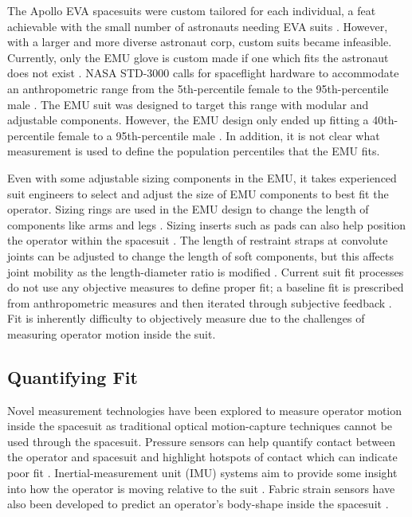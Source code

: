 \documentclass[defaultstyle,11pt]{thesis}
\begin{document}
The Apollo EVA spacesuits were custom tailored for each individual, a feat achievable with the small number of astronauts needing EVA suits \citep{Harris2001}.
However, with a larger and more diverse astronaut corp, custom suits became infeasible.
Currently, only the EMU glove is custom made if one which fits the astronaut does not exist \citep{Chappell2017}.
NASA STD-3000 calls for spaceflight hardware to accommodate an anthropometric range from the 5th-percentile female to the 95th-percentile male \citep{NASA1995}.
The EMU suit was designed to target this range with modular and adjustable components.
However, the EMU design only ended up fitting a 40th-percentile female to a 95th-percentile male \citep{Kim2019}.
In addition, it is not clear what measurement is used to define the population percentiles that the EMU fits.

Even with some adjustable sizing components in the EMU, it takes experienced suit engineers to select and adjust the size of EMU components to best fit the operator.
Sizing rings are used in the EMU design to change the length of components like arms and legs \citep{Harris2001}.
Sizing inserts such as pads can also help position the operator within the spacesuit \citep{Chappell2017}.
The length of restraint straps at convolute joints can be adjusted to change the length of soft components, but this affects joint mobility as the length-diameter ratio is modified \citep{Harris2001}.
Current suit fit processes do not use any objective measures to define proper fit; a baseline fit is prescribed from anthropometric measures and then iterated through subjective feedback \citep{Fineman2017}.
Fit is inherently difficulty to objectively measure due to the challenges of measuring operator motion inside the suit.

\hypertarget{quantifying-fit}{%
\subsection{Quantifying Fit}\label{quantifying-fit}}

Novel measurement technologies have been explored to measure operator motion inside the spacesuit as traditional optical motion-capture techniques cannot be used through the spacesuit.
Pressure sensors can help quantify contact between the operator and spacesuit and highlight hotspots of contact which can indicate poor fit \citep{Anderson2014, Anderson2015, Anderson2015b}.
Inertial-measurement unit (IMU) systems aim to provide some insight into how the operator is moving relative to the suit \citep{Bertrand2014, Fineman2018, Shen2019}.
Fabric strain sensors have also been developed to predict an operator's body-shape inside the spacesuit \citep{Kim2019}.
\end{document}
